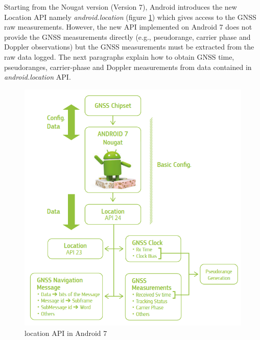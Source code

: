 Starting from the Nougat version (Version 7), Android introduces the new Location API namely \textit{android.location} (figure \ref{FIG:locapiand7}) which gives access to the GNSS raw measurements. However, the new API
implemented on Android 7 does not provide the GNSS measurements directly (e.g., pseudorange, carrier phase and Doppler observations) but the GNSS measurements must be extracted from the raw data logged.
The next paragraphs explain how to obtain GNSS time, pseudoranges,
carrier-phase and Doppler measurements from data contained in \textit{android.location} API. 

\begin{figure}[H] 
	\centering
	\includegraphics[scale=0.75]{fig/android7API.png} 
	\caption{location API in Android 7}
	\label{FIG:locapiand7} 
\end{figure}

